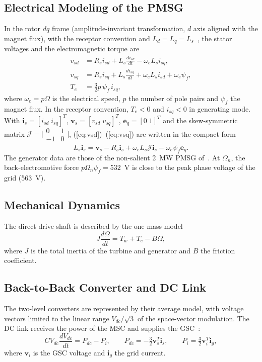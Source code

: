 \documentclass[11pt,a4paper]{article}
\newcommand{\bv}[1]{\mathbf{#1}}
\newcommand{\Jm}{\boldsymbol{\mathcal{J}}}
\begin{document}
\subsection{Electrical Modeling of the PMSG}
In the rotor $dq$ frame (amplitude-invariant transformation, $d$ axis aligned with the magnet flux),
with the receptor convention and $L_d=L_q=L_s$~\cite{aimene2022}, the stator voltages and the
electromagnetic torque are
\begin{align}
v_{sd} &= R_s i_{sd} + L_s\frac{di_{sd}}{dt} - \omega_e L_s i_{sq},\label{eq:vsd}\\
v_{sq} &= R_s i_{sq} + L_s\frac{di_{sq}}{dt} + \omega_e L_s i_{sd} + \omega_e\psi_f,\label{eq:vsq}\\
T_e &= \tfrac32 p\,\psi_f\, i_{sq},\label{eq:te}
\end{align}
where $\omega_e=p\Omega$ is the electrical speed, $p$ the number of pole pairs and $\psi_f$ the magnet
flux. In the receptor convention, $T_e<0$ and $i_{sq}<0$ in generating mode. With
$\bv{i}_s=[i_{sd}\;i_{sq}]^T$, $\bv{v}_s=[v_{sd}\;v_{sq}]^T$, $\bv{e}_q=[0\;1]^T$ and the
skew-symmetric matrix $\Jm=\bigl[\begin{smallmatrix}0&1\\-1&0\end{smallmatrix}\bigr]$,
(\ref{eq:vsd})--(\ref{eq:vsq}) are written in the compact form
\begin{equation}
L_s\dot{\bv{i}}_s = \bv{v}_s - R_s\bv{i}_s + \omega_eL_s\Jm\bv{i}_s - \omega_e\psi_f\bv{e}_q .
\label{eq:pmsg}
\end{equation}
The generator data are those of the non-salient 2~MW PMSG of~\cite{hasan2021}. At $\Omega_n$, the
back-electromotive force $p\Omega_n\psi_f=532$~V is close to the peak phase voltage of the grid (563~V).

\subsection{Mechanical Dynamics}
The direct-drive shaft is described by the one-mass model
\begin{equation}
J\frac{d\Omega}{dt} = T_w + T_e - B\Omega ,
\label{eq:shaft}
\end{equation}
where $J$ is the total inertia of the turbine and generator and $B$ the friction coefficient.

\subsection{Back-to-Back Converter and DC Link}
The two-level converters are represented by their average model, with voltage vectors limited to the
linear range $V_{dc}/\sqrt3$ of the space-vector modulation. The DC link receives the power of the MSC
and supplies the GSC~\cite{aimene2022}:
\begin{equation}
CV_{dc}\frac{dV_{dc}}{dt} = P_{dc} - P_i,\qquad P_{dc}=-\tfrac32\bv{v}_s^T\bv{i}_s,\qquad
P_i=\tfrac32\bv{v}_i^T\bv{i}_g ,
\label{eq:dc}
\end{equation}
where $\bv{v}_i$ is the GSC voltage and $\bv{i}_g$ the grid current.
\end{document}
